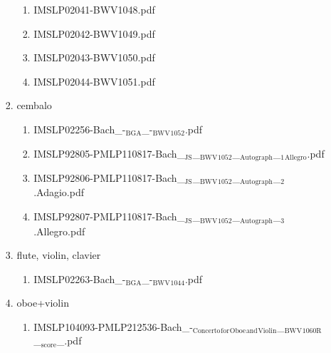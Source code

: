 \documentclass[11pt]{article}
\begin{document}
\begin{enumerate}
\begin{enumerate}
\begin{enumerate}
\begin{enumerate}
\item IMSLP02041-BWV1048.pdf
\label{sec-1-1-1-1-44-6-1-5-5}

\item IMSLP02042-BWV1049.pdf
\label{sec-1-1-1-1-44-6-1-5-6}

\item IMSLP02043-BWV1050.pdf
\label{sec-1-1-1-1-44-6-1-5-7}

\item IMSLP02044-BWV1051.pdf
\label{sec-1-1-1-1-44-6-1-5-8}
\end{enumerate}

\item cembalo
\label{sec-1-1-1-1-44-6-1-6}
\begin{enumerate}
\item IMSLP02256-Bach\_-$_{\text{BGA}}$\_-$_{\text{BWV}}$$_{\text{1052}}$.pdf
\label{sec-1-1-1-1-44-6-1-6-1}

\item IMSLP92805-PMLP110817-Bach\_$_{\text{JS}}$\_$_{\text{BWV}}$$_{\text{1052}}$\_$_{\text{Autograph}}$\_$_{\text{1}}$$_{\text{Allegro}}$.pdf
\label{sec-1-1-1-1-44-6-1-6-2}

\item IMSLP92806-PMLP110817-Bach\_$_{\text{JS}}$\_$_{\text{BWV}}$$_{\text{1052}}$\_$_{\text{Autograph}}$\_$_{\text{2}}$.Adagio.pdf
\label{sec-1-1-1-1-44-6-1-6-3}

\item IMSLP92807-PMLP110817-Bach\_$_{\text{JS}}$\_$_{\text{BWV}}$$_{\text{1052}}$\_$_{\text{Autograph}}$\_$_{\text{3}}$.Allegro.pdf
\label{sec-1-1-1-1-44-6-1-6-4}
\end{enumerate}

\item flute, violin, clavier
\label{sec-1-1-1-1-44-6-1-7}
\begin{enumerate}
\item IMSLP02263-Bach\_-$_{\text{BGA}}$\_-$_{\text{BWV}}$$_{\text{1044}}$.pdf
\label{sec-1-1-1-1-44-6-1-7-1}
\end{enumerate}

\item oboe+violin
\label{sec-1-1-1-1-44-6-1-8}
\begin{enumerate}
\item IMSLP104093-PMLP212536-Bach\_-$_{\text{Concerto}}$$_{\text{for}}$$_{\text{Oboe}}$$_{\text{and}}$$_{\text{Violin}}$\_$_{\text{BWV}}$$_{\text{1060R}}$\_$_{\text{score}}$\_.pdf
\label{sec-1-1-1-1-44-6-1-8-1}
\end{enumerate}


\end{enumerate}
\end{enumerate}
\end{enumerate}
\end{document}
